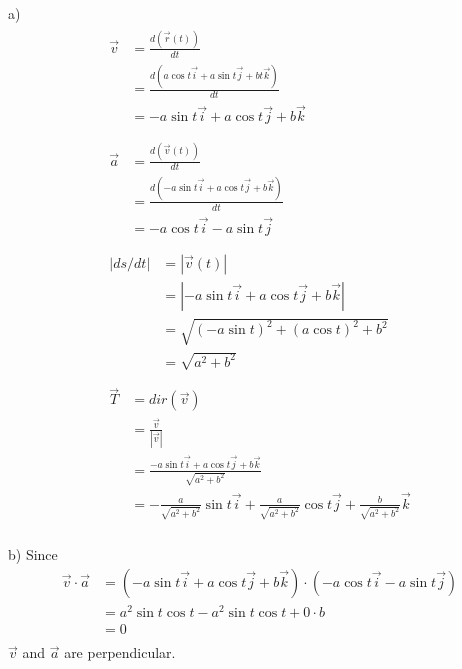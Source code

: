 \documentclass{article}
\begin{document}
a) 
\begin{gather*}
  \begin{split}
    \vec{v} &= \frac{d(\vec{r}(t))}{dt} \\
            &= \frac{d(a \cos t \vec{i} + a \sin t \vec{j} + bt \vec{k})}{dt} \\
            &= - a \sin t \vec{i} + a \cos t \vec{j} + b \vec{k} \\
  \end{split} \\
  \begin{split}
    \vec{a} &= \frac{d(\vec{v}(t))}{dt} \\
            &= \frac{d(- a \sin t \vec{i} + a \cos t \vec{j} + b \vec{k})}{dt} \\
            &= - a \cos t \vec{i} - a \sin t \vec{j} \\
  \end{split} \\
  \begin{split}
    |ds/dt| &= |\vec{v}(t)| \\
            &= |- a \sin t \vec{i} + a \cos t \vec{j} + b \vec{k}| \\
            &= \sqrt{(-a \sin t)^2 + (a \cos t)^2 + b^2} \\
            &= \sqrt{a^2 + b^2} \\
  \end{split} \\
  \begin{split}
    \vec{T} &= dir(\vec{v}) \\
            &= \frac{\vec{v}}{|\vec{v}|} \\
            &= \frac{- a \sin t \vec{i} + a \cos t \vec{j} + b \vec{k}}{\sqrt{a^2 + b^2}} \\
            &= - \frac{a}{\sqrt{a^2 + b^2}} \sin t \vec{i} + \frac{a}{\sqrt{a^2 + b^2}} \cos t \vec{j} + \frac{b}{\sqrt{a^2 + b^2}} \vec{k} \\
  \end{split}
\end{gather*}

b) 
Since
\begin{equation*}
  \begin{split}
    \vec{v} \cdot \vec{a} &= (- a \sin t \vec{i} + a \cos t \vec{j} + b \vec{k}) \cdot (- a \cos t \vec{i} - a \sin t \vec{j}) \\
                          &= a^2 \sin t \cos t - a^2 \sin t \cos t + 0 \cdot b \\
                          &= 0 \\
  \end{split}
\end{equation*}
$\vec{v}$ and $\vec{a}$ are perpendicular.
\end{document}
